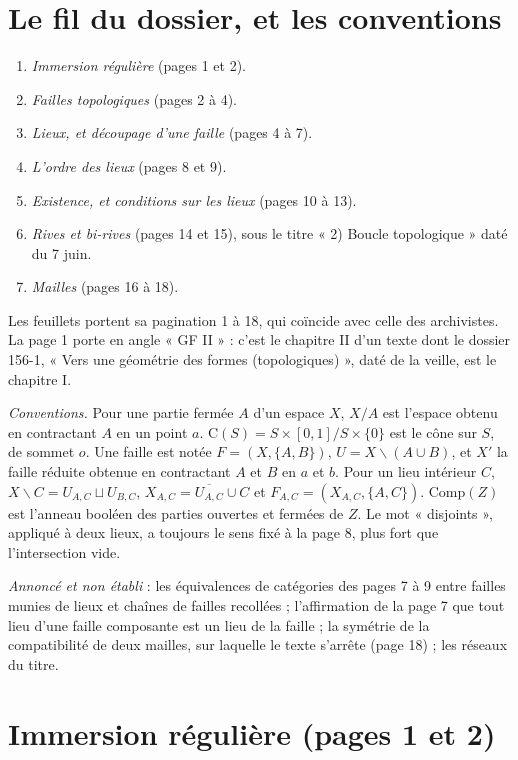 \documentclass[11pt,a4paper]{article}
\begin{document}
\section*{Le fil du dossier, et les conventions}

\begin{enumerate}
\item[1.] \emph{Immersion régulière} (pages 1 et 2).
\item[2.] \emph{Failles topologiques} (pages 2 à 4).
\item[3.] \emph{Lieux, et découpage d'une faille} (pages 4 à 7).
\item[4.] \emph{L'ordre des lieux} (pages 8 et 9).
\item[5.] \emph{Existence, et conditions sur les lieux} (pages 10 à 13).
\item[6.] \emph{Rives et bi-rives} (pages 14 et 15), sous le titre « 2) Boucle
topologique » daté du 7 juin.
\item[7.] \emph{Mailles} (pages 16 à 18).
\end{enumerate}

Les feuillets portent sa pagination 1 à 18, qui coïncide avec celle des
archivistes. La page 1 porte en angle « GF II » : c'est le chapitre II d'un
texte dont le dossier 156-1, « Vers une géométrie des formes (topologiques) »,
daté de la veille, est le chapitre I.

\emph{Conventions.} Pour une partie fermée $A$ d'un espace $X$, $X/A$ est
l'espace obtenu en contractant $A$ en un point $a$. $\mathrm{C}(S) = S \times
[0,1] / S \times \{0\}$ est le cône sur $S$, de sommet $o$. Une faille est notée
$F = (X, \{A,B\})$, $U = X \smallsetminus (A \cup B)$, et $X'$ la faille réduite
obtenue en contractant $A$ et $B$ en $a$ et $b$. Pour un lieu intérieur $C$,
$X \smallsetminus C = U_{A,C} \sqcup U_{B,C}$, $X_{A,C} = \overline{U_{A,C}} \cup
C$ et $F_{A,C} = (X_{A,C}, \{A,C\})$. $\mathrm{Comp}(Z)$ est l'anneau booléen des
parties ouvertes et fermées de $Z$. Le mot « disjoints », appliqué à deux lieux,
a toujours le sens fixé à la page 8, plus fort que l'intersection vide.

\emph{Annoncé et non établi} : les équivalences de
catégories des pages 7 à 9 entre failles munies de lieux et chaînes de failles
recollées ; l'affirmation de la page 7 que tout lieu d'une faille composante est
un lieu de la faille ; la symétrie de la compatibilité de deux mailles, sur
laquelle le texte s'arrête (page 18) ; les réseaux du titre.

\section*{Immersion régulière (pages 1 et 2)}
\end{document}
